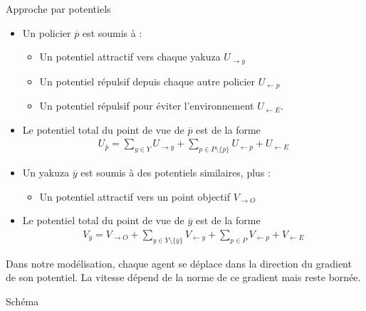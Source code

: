 \documentclass[final,hyperref={pdfpagelabels=false}]{beamer}
\begin{document}
\begin{frame}[t]
\begin{columns}[t]
\begin{column}{.465\textwidth}
\begin{block}{Approche par potentiels}
\begin{itemize}
\item Un policier $\overline{p}$ est soumis \`a :
\begin{itemize}
\item Un potentiel attractif vers chaque yakuza $U_{\to y}$
\item Un potentiel r\'epulsif depuis chaque \alert{autre} policier $U_{\gets p}$
\item Un potentiel r\'epulsif pour \'eviter l'environnement $U_{\gets E}$.
\end{itemize}
\item Le potentiel total du point de vue de $\overline{p}$ est de la forme
\begin{align*}
U_{\overline{p}} = \sum_{y \in Y} U_{\to y} + \sum_{p \in P\setminus\{\overline{p}\}} U_{\gets p} + U_{\gets E}
\end{align*}
\item Un yakuza $\overline{y}$ est soumis \`a des potentiels similaires, plus :
\begin{itemize}
\item Un potentiel attractif vers un point objectif $V_{\to O}$
\end{itemize}
\item Le potentiel total du point de vue de $\overline{y}$ est de la forme
\begin{align*}
V_{\overline{y}} = V_{\to O} + \sum_{y \in Y \setminus \{\overline{y}\}} V_{\gets y} + \sum_{p \in P} V_{\gets p} + V_{\gets E}
\end{align*}
\end{itemize}
Dans notre mod\'elisation, chaque agent se d\'eplace dans la direction du gradient de son potentiel. La vitesse d\'epend de la norme de ce gradient mais reste born\'ee.
\end{block}


\begin{block}{Sch\'ema}


\end{block}
\end{column}
\end{columns}
\end{frame}
\end{document}
